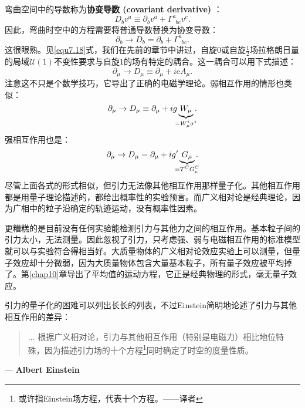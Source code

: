 弯曲空间中的导数称为{\bf 协变导数 (covariant derivative)}%
%
：
\begin{equation}
\label{equ12.10}
    D_b v^a \equiv \partial_b v^a + \Gamma^a_{\phantom{a}bc} v^c.
\end{equation}
因此，弯曲时空中的方程需要将普通导数替换为协变导数：
\begin{equation}
\label{equ12.11}
    \partial_b \to D_b = \partial_b + \Gamma^a_{\phantom{a}bc}.
\end{equation}
这很眼熟。见\ref{equ7.18}式，我们在先前的章节中讲过，自旋$0$或自旋$\frac{1}{2}$场拉格朗日量的局域$\mathcal{U}(1)$不变性要求与自旋$1$的场有特定的耦合。这一耦合可以用下式描述：
\begin{equation}
\label{equ12.12}
    \partial_\mu \to D_\mu \equiv \partial_\mu + i \mathrm{e} A_\mu.
\end{equation}
注意这不只是个数学技巧，它导出了正确的电磁学理论。弱相互作用的情形也类似：
\begin{equation}
\label{equ12.13}
    \partial_\mu \to D_\mu \equiv \partial_\mu + i g \underbrace{W_\mu}_{\mathclap{= W_\mu^i \sigma^i}}.
\end{equation}
强相互作用也是：
\begin{equation}
\label{equ12.14}
    \partial_\mu \to D_\mu = \partial_\mu + i g' \underbrace{G_\mu}_{\mathclap{= T^C G^C_\mu}}.
\end{equation}
尽管上面各式的形式相似，但引力无法像其他相互作用那样量子化。其他相互作用都是用量子理论描述的，都给出概率性的实验预言。而广义相对论是经典理论，因为广相中的粒子沿确定的轨迹运动，没有概率性因素。

更糟糕的是目前没有任何实验能检测引力与其他力之间的相互作用。基本粒子间的引力太小，无法测量。因此忽视了引力，只考虑强、弱与电磁相互作用的标准模型就可以与实验符合得相当好。大质量物体的广义相对论效应实验上可以测量，但量子效应却十分微弱，因为大质量物体包含大量基本粒子，所有量子效应被平均掉了。第\ref{chap10}章导出了平均值的运动方程，它正是经典物理的形式，毫无量子效应。

引力的量子化的困难可以列出长长的列表，不过Einstein简明地论述了引力与其他相互作用的差异：
\begin{quote}
$\dots$ 根据广义相对论，引力与其他相互作用（特别是电磁力）相比地位特殊，因为描述引力场的十个方程\footnote{或许指Einstein场方程，代表十个方程。——译者}同时确定了时空的度量性质。
\end{quote}
\begin{flushright}
--- {\bf Albert Einstein}
\end{flushright}

